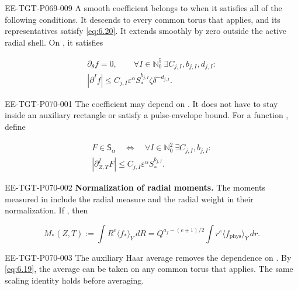 \begin{definition}\label{def:6.4}
\begin{EESegment}{EE-TGT-P069-009}
A smooth coefficient  belongs to  when it satisfies all of the following conditions. It descends to every common torus that applies, and its representatives satisfy \eqref{eq:6.20}. It extends smoothly by zero outside the active radial shell. On , it satisfies
\end{EESegment}
\begin{equation}
  \begin{gathered}
    \partial_\theta f=0,
    \qquad
    \forall I\in\mathbb N_0^5\ \exists C_{j,I},b_{j,I},d_{j,I}:\\
    |\partial^If|\le C_{j,I}\varepsilon^\alpha
      S_*^{b_{j,I}}\zeta\delta^{-d_{j,I}}.
  \end{gathered}
  \tag{6.24}\label{eq:6.24}
\end{equation}

%
\begin{EESegment}{EE-TGT-P070-001}
The coefficient may depend on . It does not have to stay inside an auxiliary rectangle or satisfy a pulse-envelope bound. For a function , define
\end{EESegment}
\begin{equation}
  \begin{gathered}
    F\in\mathsf S_\alpha
    \quad\Longleftrightarrow\quad
    \forall I\in\mathbb N_0^2\ \exists C_{j,I},b_{j,I}:\\
    |\partial_{Z,T}^IF|\le C_{j,I}\varepsilon^\alpha S_*^{b_{j,I}}.
  \end{gathered}
  \tag{6.25}\label{eq:6.25}
\end{equation}
\end{definition}

\begin{EESegment}{EE-TGT-P070-002}
\textbf{Normalization of radial moments.} The moments measured in  include the radial measure and the radial weight in their normalization. If , then
\end{EESegment}
\begin{equation}
  M_*(Z,T):=\int R^e\langle f_*\rangle_Y\,dR
  =Q^{a_f-(e+1)/2}\int r^e\langle f_{\mathrm{phys}}\rangle_Y\,dr.
  \tag{6.26}\label{eq:6.26}
\end{equation}
\begin{EESegment}{EE-TGT-P070-003}
The auxiliary Haar average removes the dependence on . By \eqref{eq:6.19}, the average can be taken on any common torus that applies. The same scaling identity holds before averaging.
\end{EESegment}

